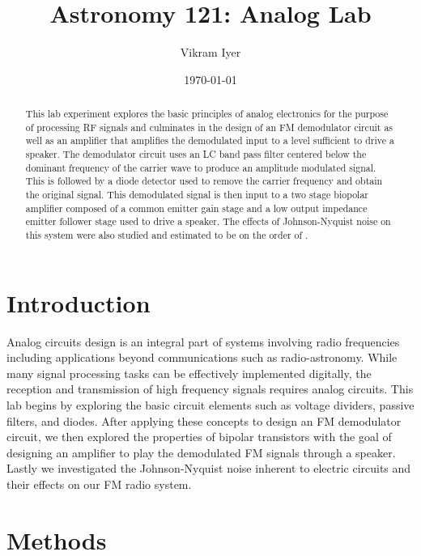 \documentclass[11pt]{article}
\title{Astronomy 121: Analog Lab}
\author{Vikram Iyer}
\date{\today}
\begin{document}
\maketitle

\begin{abstract}
  This lab experiment explores the basic principles of analog electronics for the purpose of processing RF signals and culminates in the design of an FM demodulator circuit as well as an amplifier that amplifies the demodulated input to a level sufficient to drive a speaker. The demodulator circuit uses an LC band pass filter centered below the dominant frequency of the carrier wave to produce an amplitude modulated signal.  This is followed by a diode detector used to remove the carrier frequency and obtain the original signal.  This demodulated signal is then input to a two stage biopolar amplifier composed of a common emitter gain stage and a low output impedance emitter follower stage used to drive a speaker. The effects of Johnson-Nyquist noise on this system were also studied and estimated to be on the order of .
\end{abstract}

\section{Introduction}
  Analog circuits design is an integral part of systems involving radio frequencies including applications beyond communications such as radio-astronomy. While many signal processing tasks can be effectively implemented digitally, the reception and transmission of high frequency signals requires analog circuits.  This lab begins by exploring the basic circuit elements such as voltage dividers, passive filters, and diodes. After applying these concepts to design an FM demodulator circuit, we then explored the properties of bipolar transistors with the goal of designing an amplifier to play the demodulated FM signals through a speaker. Lastly we investigated the Johnson-Nyquist noise inherent to electric circuits and their effects on our FM radio system.

\section{Methods}
\end{document}
